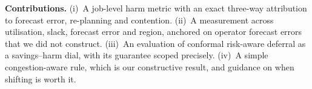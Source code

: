 \textbf{Contributions.} (i)~A job-level harm metric with an exact three-way attribution to forecast
error, re-planning and contention. (ii)~A measurement across utilisation, slack, forecast error and
region, anchored on operator forecast errors that we did not construct. (iii)~An evaluation of
conformal risk-aware deferral as a savings--harm dial, with its guarantee scoped precisely.
(iv)~A simple congestion-aware rule, which is our constructive result, and guidance on when shifting
is worth it.
